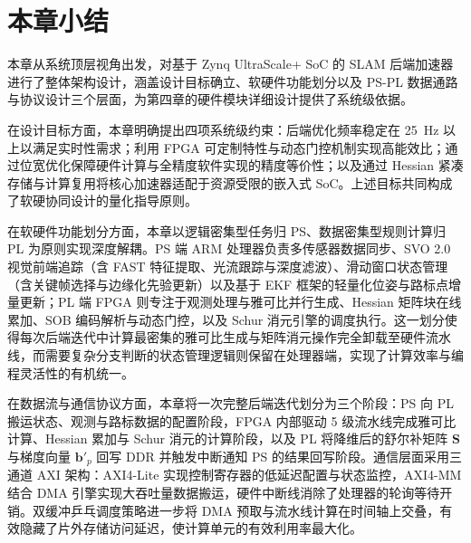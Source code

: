 \section{本章小结}

本章从系统顶层视角出发，对基于 Zynq UltraScale+ SoC 的 SLAM 后端加速器进行了整体架构设计，涵盖设计目标确立、软硬件功能划分以及 PS-PL 数据通路与协议设计三个层面，为第四章的硬件模块详细设计提供了系统级依据。

在设计目标方面，本章明确提出四项系统级约束：后端优化频率稳定在 25~Hz 以上以满足实时性需求；利用 FPGA 可定制特性与动态门控机制实现高能效比；通过位宽优化保障硬件计算与全精度软件实现的精度等价性；以及通过 Hessian 紧凑存储与计算复用将核心加速器适配于资源受限的嵌入式 SoC。上述目标共同构成了软硬协同设计的量化指导原则。

在软硬件功能划分方面，本章以逻辑密集型任务归 PS、数据密集型规则计算归 PL 为原则实现深度解耦。PS 端 ARM 处理器负责多传感器数据同步、SVO 2.0 视觉前端追踪（含 FAST 特征提取、光流跟踪与深度滤波）、滑动窗口状态管理（含关键帧选择与边缘化先验更新）以及基于 EKF 框架的轻量化位姿与路标点增量更新；PL 端 FPGA 则专注于观测处理与雅可比并行生成、Hessian 矩阵块在线累加、SOB 编码解析与动态门控，以及 Schur 消元引擎的调度执行。这一划分使得每次后端迭代中计算最密集的雅可比生成与矩阵消元操作完全卸载至硬件流水线，而需要复杂分支判断的状态管理逻辑则保留在处理器端，实现了计算效率与编程灵活性的有机统一。

在数据流与通信协议方面，本章将一次完整后端迭代划分为三个阶段：PS 向 PL 搬运状态、观测与路标数据的配置阶段，FPGA 内部驱动 5 级流水线完成雅可比计算、Hessian 累加与 Schur 消元的计算阶段，以及 PL 将降维后的舒尔补矩阵 $\mathbf{S}$ 与梯度向量 $\mathbf{b}'_p$ 回写 DDR 并触发中断通知 PS 的结果回写阶段。通信层面采用三通道 AXI 架构：AXI4-Lite 实现控制寄存器的低延迟配置与状态监控，AXI4-MM 结合 DMA 引擎实现大吞吐量数据搬运，硬件中断线消除了处理器的轮询等待开销。双缓冲乒乓调度策略进一步将 DMA 预取与流水线计算在时间轴上交叠，有效隐藏了片外存储访问延迟，使计算单元的有效利用率最大化。
